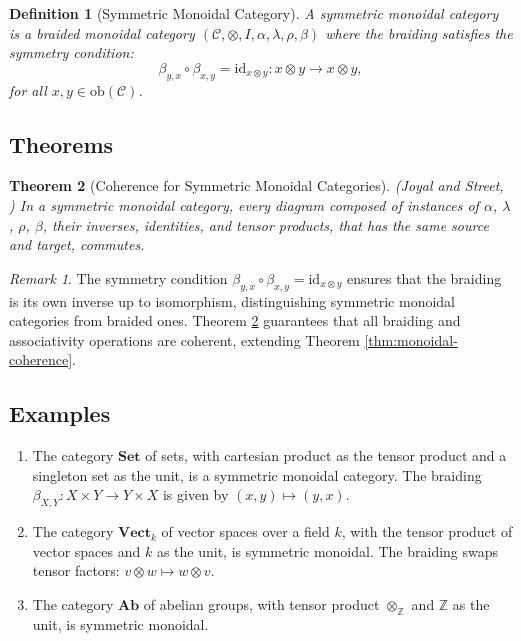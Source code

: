 \documentclass{article}
\theoremstyle{plain}
\newtheorem{theorem}{Theorem}[section]
\newtheorem{definition}[theorem]{Definition}
\theoremstyle{remark}
\newtheorem*{remark}{Remark}
\begin{document}
\begin{definition}[Symmetric Monoidal Category]
A \emph{symmetric monoidal category} is a braided monoidal category $(\mathcal{C}, \otimes, I, \alpha, \lambda, \rho, \beta)$ where the braiding satisfies the symmetry condition:
\[
\beta_{y,x} \circ \beta_{x,y} = \mathrm{id}_{x \otimes y} : x \otimes y \to x \otimes y,
\]
for all $x, y \in \mathrm{ob}(\mathcal{C})$.
\end{definition}

\subsection{Theorems}

\begin{theorem}[Coherence for Symmetric Monoidal Categories]
\label{thm:symmetric-coherence}
(Joyal and Street, \cite{JoyalStreet91}) In a symmetric monoidal category, every diagram composed of instances of $\alpha$, $\lambda$, $\rho$, $\beta$, their inverses, identities, and tensor products, that has the same source and target, commutes.
\end{theorem}

\begin{remark}
The symmetry condition $\beta_{y,x} \circ \beta_{x,y} = \mathrm{id}_{x \otimes y}$ ensures that the braiding is its own inverse up to isomorphism, distinguishing symmetric monoidal categories from braided ones. Theorem \ref{thm:symmetric-coherence} guarantees that all braiding and associativity operations are coherent, extending Theorem \ref{thm:monoidal-coherence}.
\end{remark}

\subsection{Examples}

\begin{enumerate}
    \item The category $\mathbf{Set}$ of sets, with cartesian product as the tensor product and a singleton set as the unit, is a symmetric monoidal category. The braiding $\beta_{X,Y} : X \times Y \to Y \times X$ is given by $(x, y) \mapsto (y, x)$.
    \item The category $\mathbf{Vect}_k$ of vector spaces over a field $k$, with the tensor product of vector spaces and $k$ as the unit, is symmetric monoidal. The braiding swaps tensor factors: $v \otimes w \mapsto w \otimes v$.
    \item The category $\mathbf{Ab}$ of abelian groups, with tensor product $\otimes_{\mathbb{Z}}$ and $\mathbb{Z}$ as the unit, is symmetric monoidal.
\end{enumerate}
\end{document}
